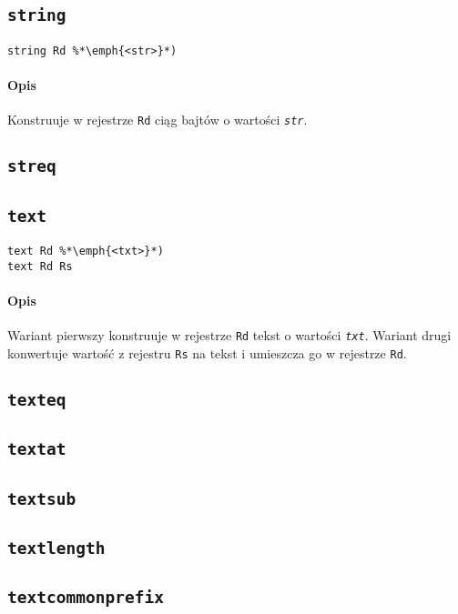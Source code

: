 \subsection{\texttt{string}}

\begin{lstlisting}
string Rd %*\emph{<str>}*)
\end{lstlisting}

\paragraph*{Opis} Konstruuje w rejestrze \texttt{Rd} ciąg bajtów o wartości \emph{\texttt{str}}.

\subsection{\texttt{streq}}

\subsection{\texttt{text}}

\begin{lstlisting}
text Rd %*\emph{<txt>}*)
text Rd Rs
\end{lstlisting}

\paragraph*{Opis} Wariant pierwszy konstruuje w rejestrze \texttt{Rd} tekst o wartości \emph{\texttt{txt}}.
Wariant drugi konwertuje wartość z rejestru \texttt{Rs} na tekst i umieszcza go w rejestrze \texttt{Rd}.

\subsection{\texttt{texteq}}
\subsection{\texttt{textat}}
\subsection{\texttt{textsub}}
\subsection{\texttt{textlength}}
\subsection{\texttt{textcommonprefix}}
